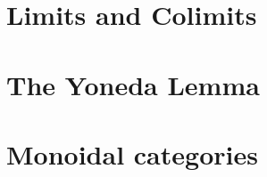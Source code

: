 \section{Limits and Colimits}
\label{sec:limits}


\section{The Yoneda Lemma}
\label{sec:yoneda}


\section{Monoidal categories}
\label{sec:monoidal-cats}


% 

